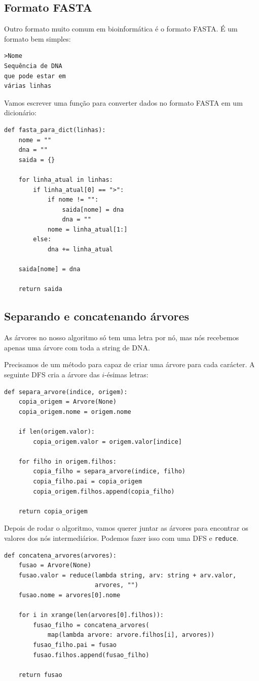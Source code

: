\documentclass[11pt]{article}
\begin{document}
\subsection{Formato FASTA}
\label{sec-3-2}

Outro formato muito comum em bioinformática é o formato FASTA. É um
formato bem simples:

\begin{verbatim}
>Nome
Sequência de DNA
que pode estar em
várias linhas
\end{verbatim}

Vamos escrever uma função para converter dados no formato FASTA em um
dicionário:
\begin{verbatim}
def fasta_para_dict(linhas):
    nome = ""
    dna = ""
    saida = {}

    for linha_atual in linhas:
        if linha_atual[0] == ">":
            if nome != "":
                saida[nome] = dna
                dna = ""
            nome = linha_atual[1:]
        else:
            dna += linha_atual

    saida[nome] = dna

    return saida
\end{verbatim}

\subsection{Separando e concatenando árvores}
\label{sec-3-3}

As árvores no nosso algoritmo só tem uma letra por nó, mas nós
recebemos apenas uma árvore com toda a string de DNA.

Precisamos de um método para capaz de criar uma árvore para cada
carácter. A seguinte DFS cria a árvore das $i$-ésimas letras:
\begin{verbatim}
def separa_arvore(indice, origem):
    copia_origem = Arvore(None)
    copia_origem.nome = origem.nome

    if len(origem.valor):
        copia_origem.valor = origem.valor[indice]

    for filho in origem.filhos:
        copia_filho = separa_arvore(indice, filho)
        copia_filho.pai = copia_origem
        copia_origem.filhos.append(copia_filho)

    return copia_origem
\end{verbatim}


Depois de rodar o algoritmo, vamos querer juntar as árvores para encontrar
os valores dos nós intermediários. Podemos fazer isso com uma DFS e \verb~reduce~.
\begin{verbatim}
def concatena_arvores(arvores):
    fusao = Arvore(None)
    fusao.valor = reduce(lambda string, arv: string + arv.valor,
                         arvores, "")
    fusao.nome = arvores[0].nome

    for i in xrange(len(arvores[0].filhos)):
        fusao_filho = concatena_arvores(
            map(lambda arvore: arvore.filhos[i], arvores))
        fusao_filho.pai = fusao
        fusao.filhos.append(fusao_filho)

    return fusao
\end{verbatim}
\end{document}
